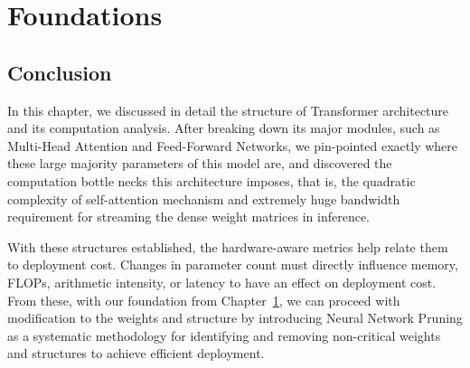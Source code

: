 
\chapter{Foundations}
\label{chap:foundations}
\def\UsePruningFoundationsIntro{}








%
%

\section{Conclusion}

In this chapter, we discussed in detail the structure of Transformer architecture and its computation analysis. After breaking down its major modules, such as Multi-Head Attention and Feed-Forward Networks, we pin-pointed exactly where these large majority parameters of this model are, and discovered the computation bottle necks this architecture imposes, that is, the quadratic complexity of self-attention mechanism and extremely huge bandwidth requirement for streaming the dense weight matrices in inference.


With these structures established, the hardware-aware metrics help relate them to deployment cost. Changes in parameter count must directly influence memory, FLOPs, arithmetic intensity, or latency to have an effect on deployment cost. From these, with our foundation from Chapter~\ref{chap:foundations}, we can proceed with modification to the weights and structure by introducing Neural Network Pruning as a systematic methodology for identifying and removing non-critical weights and structures to achieve efficient deployment.
